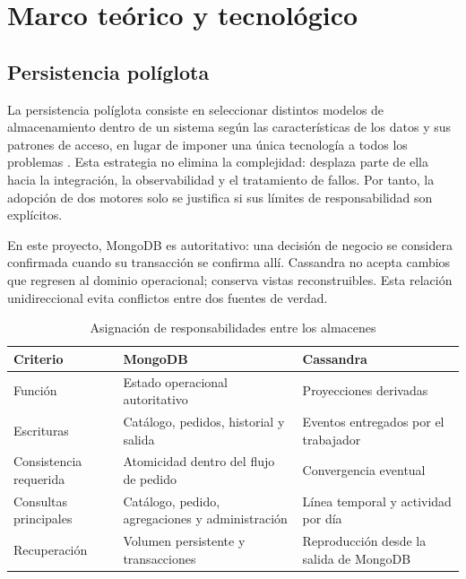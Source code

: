 \chapter{Marco teórico y tecnológico}
\label{chap:fundamentos}

\section{Persistencia políglota}

La persistencia políglota consiste en seleccionar distintos modelos de almacenamiento dentro de un sistema según las características de los datos y sus patrones de acceso, en lugar de imponer una única tecnología a todos los problemas \parencite{sadalage2012}. Esta estrategia no elimina la complejidad: desplaza parte de ella hacia la integración, la observabilidad y el tratamiento de fallos. Por tanto, la adopción de dos motores solo se justifica si sus límites de responsabilidad son explícitos.

En este proyecto, MongoDB es autoritativo: una decisión de negocio se considera confirmada cuando su transacción se confirma allí. Cassandra no acepta cambios que regresen al dominio operacional; conserva vistas reconstruibles. Esta relación unidireccional evita conflictos entre dos fuentes de verdad.

\begin{table}[H]
  \centering
  \caption{Asignación de responsabilidades entre los almacenes}
  \label{tab:responsabilidades}
  \begin{tabularx}{\textwidth}{@{}p{3cm}YY@{}}
    \toprule
    \textbf{Criterio} & \textbf{MongoDB} & \textbf{Cassandra} \\
    \midrule
    Función & Estado operacional autoritativo & Proyecciones derivadas \\
    Escrituras & Catálogo, pedidos, historial y salida & Eventos entregados por el trabajador \\
    Consistencia requerida & Atomicidad dentro del flujo de pedido & Convergencia eventual \\
    Consultas principales & Catálogo, pedido, agregaciones y administración & Línea temporal y actividad por día \\
    Recuperación & Volumen persistente y transacciones & Reproducción desde la salida de MongoDB \\
    \bottomrule
  \end{tabularx}
\end{table}

